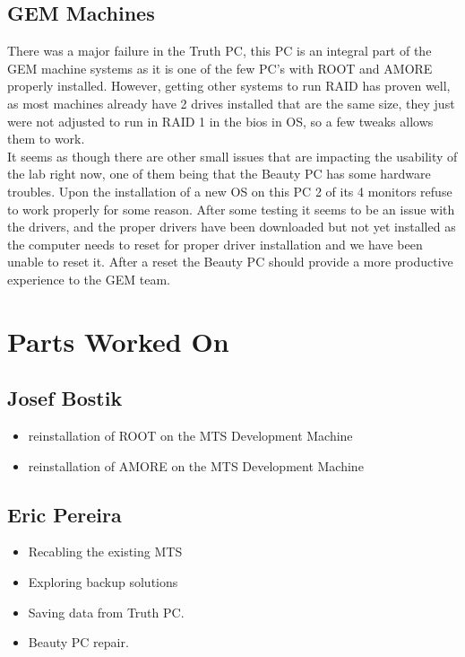 \documentclass[12pt]{article}
\newcommand\tab[1][1cm]{\hspace*{#1}}
\begin{document}
\subsection{GEM Machines}

\tab There was a major failure in the Truth PC, this PC is an integral part of
the GEM machine systems as it is one of the few PC's with ROOT and AMORE 
properly installed. However, getting other systems to run RAID has proven well, as most machines already have 2 drives installed that are the same size, they
just were not adjusted to run in RAID 1 in the bios in OS, so a few tweaks 
allows them to work. \\

\tab It seems as though there are other small issues that are impacting the
usability of the lab right now, one of them being that the Beauty PC has some
hardware troubles. Upon the installation of a new OS on this PC 2 of its 4 
monitors refuse to work properly for some reason. After some testing it seems
to be an issue with the drivers, and the proper drivers have been downloaded but
not yet installed as the computer needs to reset for proper driver installation 
and we have been unable to reset it. After a reset the Beauty PC should provide
a more productive experience to the GEM team.  

\section{Parts Worked On}

\subsection{Josef Bostik}

\begin{itemize}
\item reinstallation of ROOT on the MTS Development Machine
\item reinstallation of AMORE on the MTS Development Machine
\end{itemize}

\subsection{Eric Pereira}

\begin{itemize}
\item Recabling the existing MTS
\item Exploring backup solutions
\item Saving data from Truth PC. 
\item Beauty PC repair. 
\end{itemize}
\end{document}
